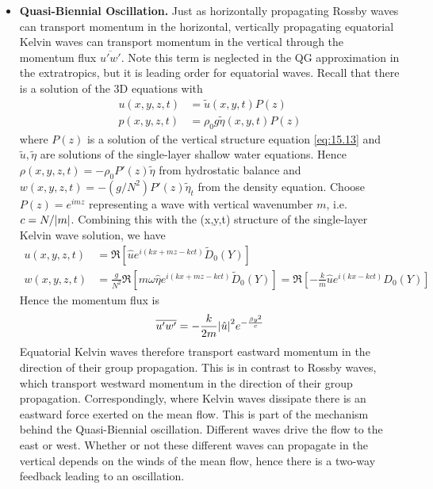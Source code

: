 \documentclass{jknotes}
\begin{document}
\begin{eg}
\begin{itemize}
		\item \textbf{Quasi-Biennial Oscillation.} 
			Just as horizontally propagating Rossby waves can transport
			momentum in the horizontal, vertically propagating equatorial
			Kelvin waves can transport momentum in the vertical through the
			momentum flux $\overline{u'w'}$. Note this term is neglected in
			the QG approximation in the extratropics, but it is leading order
			for equatorial waves. Recall that there is a solution of the 3D
			equations with 
			\begin{align}
				u(x,y,z,t) &= \tilde{u}(x,y,t)P(z)\\
				p(x,y,z,t) &= \rho_0 g \tilde{\eta}(x,y,t)P(z)
			\end{align}
			where $P(z)$ is a solution of the vertical structure equation
			\eqref{eq:15.13} and $\tilde{u}, \tilde{\eta}$ are solutions of
			the single-layer shallow water equations. Hence $\rho(x,y,z,t) =
			-\rho_0 P'(z)\tilde{\eta}$ from hydrostatic balance and
			$w(x,y,z,t) = -(g/N^2)P'(z)\tilde{\eta}_t$ from the density
			equation. Choose $P(z) = e^{imz}$ representing a wave with
			vertical wavenumber $m$, i.e. $c=N/\abs{m}$. Combining this with
			the (x,y,t) structure of the single-layer Kelvin wave solution, we
			have
			\begin{align}
				u(x,y,z,t) &= \Re\left[\hat{u}e^{i(kx+mz-kct)}
				\tilde{D}_0(Y)\right] \\
				w(x,y,z,t) &= \frac{g}{N^2}
				\Re\left[m\omega\hat{\eta}e^{i(kx+mz-kct)}\tilde{D}_0(Y)\right]
				= \Re\left[ -\frac{k}{m}\hat{u}e^{i(kx-kct)}D_0(Y)\right]
			\end{align}
			Hence the momentum flux is
			\begin{equation}
				\overline{u'w'} = -\frac{k}{2m}\abs{\hat{u}}^2 e^{-\frac{\beta
				y^2}{c}}
			\end{equation}
			Equatorial Kelvin waves therefore transport eastward momentum in
			the direction of their group propagation. This is in contrast to
			Rossby waves, which transport westward momentum in the direction
			of their group propagation. Correspondingly, where Kelvin waves
			dissipate there is an eastward force exerted on the mean flow.
			This is part of the mechanism behind the Quasi-Biennial
			oscillation. Different waves drive the flow to the east or west.
			Whether or not these different waves can propagate in the vertical
			depends on the winds of the mean flow, hence there is a two-way
			feedback leading to an oscillation.
	\end{itemize}
\end{eg}
\end{document}
